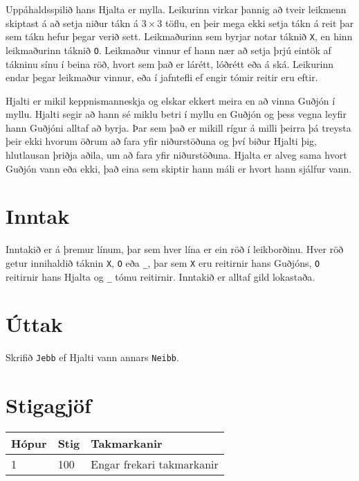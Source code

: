 %
Uppáhaldsspilið hans Hjalta er mylla. Leikurinn virkar þannig að tveir leikmenn
skiptast á að setja niður tákn á $3\times 3$ töflu, en þeir mega ekki setja
tákn á reit þar sem tákn hefur þegar verið sett. Leikmaðurinn sem byrjar notar
táknið \texttt{X}, en hinn leikmaðurinn táknið \texttt{O}. Leikmaður vinnur ef
hann nær að setja þrjú eintök af tákninu sínu í beina röð, hvort sem það er
lárétt, lóðrétt eða á ská. Leikurinn endar þegar leikmaður vinnur, eða í
jafntefli ef engir tómir reitir eru eftir.

Hjalti er mikil keppnismanneskja og elskar ekkert meira en að vinna Guðjón í myllu. Hjalti segir að hann sé miklu betri í myllu en Guðjón og þess vegna leyfir hann Guðjóni alltaf að byrja.
Þar sem það er mikill rígur á milli þeirra þá treysta þeir ekki hvorum öðrum að fara yfir niðurstöðuna og því biður Hjalti þig, hlutlausan þriðja aðila, um að fara yfir niðurstöðuna.
Hjalta er alveg sama hvort Guðjón vann eða ekki, það eina sem skiptir hann máli er hvort hann sjálfur vann.

\section*{Inntak}
Inntakið er á þremur línum, þar sem hver lína er ein röð í leikborðinu.
Hver röð getur innihaldið táknin \texttt{X}, \texttt{O} eða \texttt{\_}, þar sem \texttt{X} eru reitirnir hans Guðjóns, \texttt{O} reitirnir hans Hjalta og \texttt{\_} tómu reitirnir.
Inntakið er alltaf gild lokastaða.

\section*{Úttak}
Skrifið \texttt{Jebb} ef Hjalti vann annars \texttt{Neibb}.

\section*{Stigagjöf}
\begin{tabular}{|l|l|l|}
\hline
Hópur & Stig & Takmarkanir \\ \hline
1     & 100   & Engar frekari takmarkanir \\ \hline
\end{tabular}

